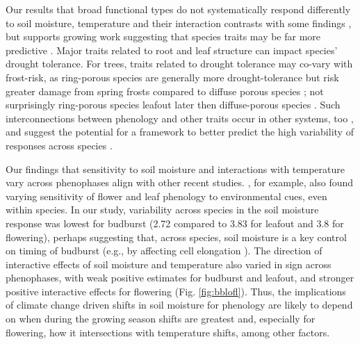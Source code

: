 \documentclass{article}
\begin{document}
\par Our results that broad functional types do not systematically respond differently to soil moisture, temperature and their interaction contrasts with some findings \citep[e.g.,][]{rollinson2012,castillioni2022effects}, but supports growing work suggesting that species traits may be far more predictive \cite[e.g., ][]{diaz2016global}. Major traits related to root and leaf structure can impact species' drought tolerance. For trees, traits related to drought tolerance may co-vary with frost-risk, as ring-porous species are generally more drought-tolerance but risk greater damage from spring frosts compared to diffuse porous species \citep{bader2022less,wang2022contrast}; not surprisingly ring-porous species leafout later then diffuse-porous species \cite{lechowicz1984}. Such interconnections between phenology and other traits occur in other systems, too \citep[e.g.,][]{ocheltree2020identification}, and suggest the potential for a framework to better predict the high variability of responses across species \citep[e.g.,][]{morales2024phylogenetic}.

\par Our findings that sensitivity to soil moisture and interactions with temperature vary across phenophases align with other recent studies. \citet{buonaiuto2021differences}, for example, also found varying sensitivity of flower and leaf phenology to environmental cues, even within species. In our study, variability across species in the soil moisture response was lowest for budburst (2.72 compared to 3.83 for leafout and  3.8 for flowering), perhaps suggesting that, across species, soil moisture is a key control on timing of budburst (e.g., by affecting cell elongation \citep{essiamah1986}). The direction of interactive effects of soil moisture and temperature also varied in sign across phenophases, with weak positive estimates for budburst and leafout, and stronger positive interactive effects for flowering (Fig. \ref{fig:bblofl}). Thus, the implications of climate change driven shifts in soil moisture for phenology are likely to depend on when during the growing season shifts are greatest and, especially for flowering, how it intersections with temperature shifts, among other factors. 
\end{document}
